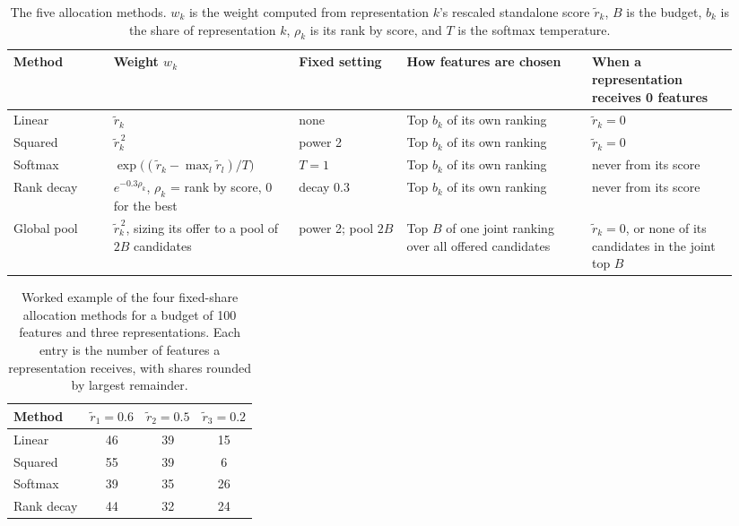 \begin{table}[htbp]
\centering
\small
\begin{adjustbox}{max width=\textwidth,max totalheight=0.78\textheight}
\begin{tabular}{@{}P{0.13\linewidth}P{0.24\linewidth}P{0.14\linewidth}P{0.24\linewidth}P{0.19\linewidth}@{}}
\toprule
Method & Weight $w_k$ & Fixed setting & How features are chosen & When a representation receives 0 features \\
\midrule
Linear & $\tilde r_k$ & none & Top $b_k$ of its own ranking & $\tilde r_k = 0$ \\
Squared & $\tilde r_k^{\,2}$ & power 2 & Top $b_k$ of its own ranking & $\tilde r_k = 0$ \\
Softmax & $\exp\big((\tilde r_k - \max_l \tilde r_l)/T\big)$ & $T = 1$ & Top $b_k$ of its own ranking & never from its score \\
Rank decay & $e^{-0.3\rho_k}$, $\rho_k$ = rank by score, 0 for the best & decay 0.3 & Top $b_k$ of its own ranking & never from its score \\
Global pool & $\tilde r_k^{\,2}$, sizing its offer to a pool of $2B$ candidates & power 2; pool $2B$ & Top $B$ of one joint ranking over all offered candidates & $\tilde r_k = 0$, or none of its candidates in the joint top $B$ \\
\bottomrule
\end{tabular}
\end{adjustbox}
\caption[The five allocation methods searched.]{The five allocation methods. $w_k$ is the weight computed from representation $k$'s rescaled standalone score $\tilde r_k$, $B$ is the budget, $b_k$ is the share of representation $k$, $\rho_k$ is its rank by score, and $T$ is the softmax temperature.}
\label{tab:alloc_methods}
\end{table}

\begin{table}[htbp]
\centering
\begin{adjustbox}{max width=\textwidth,max totalheight=0.78\textheight}
\begin{tabular}{@{}lccc@{}}
\toprule
Method & $\tilde r_1 = 0.6$ & $\tilde r_2 = 0.5$ & $\tilde r_3 = 0.2$ \\
\midrule
Linear & 46 & 39 & 15 \\
Squared & 55 & 39 & 6 \\
Softmax & 39 & 35 & 26 \\
Rank decay & 44 & 32 & 24 \\
\bottomrule
\end{tabular}
\end{adjustbox}
\caption[Worked example of the four fixed-share allocation methods.]{Worked example of the four fixed-share allocation methods for a budget of 100 features and three representations. Each entry is the number of features a representation receives, with shares rounded by largest remainder.}
\label{tab:alloc_example}
\end{table}

